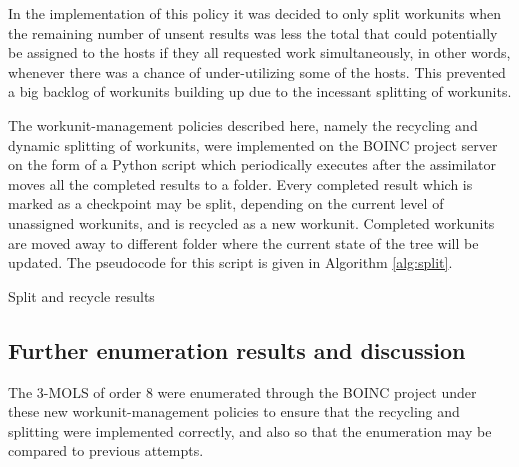 In the implementation of this policy it was decided to only split workunits when the remaining number of unsent results was less the total that could potentially be assigned to the hosts if they all requested work simultaneously, in other words, whenever there was a chance of under-utilizing some of the hosts. This prevented a big backlog of workunits building up due to the incessant splitting of workunits. 

The workunit-management policies described here, namely the recycling and dynamic splitting of workunits, were implemented on the BOINC project server on the form of a Python \cite{python} script which periodically executes after the assimilator moves all the completed results to a folder. Every completed result which is marked as a checkpoint may be split, depending on the current level of unassigned workunits, and is recycled as a new workunit. Completed workunits  are moved away to different folder where the current state of the tree will be updated. The pseudocode for this script is given in Algorithm \ref{alg:split}.
 \begin{algorithm}[htb]
 \BlankLine
{}	
\caption{Split and recycle results} \label{alg:split}%

\end{algorithm}


\subsection{Further enumeration results and discussion}
The 3-MOLS of order 8 were enumerated through the BOINC project under these new workunit-management policies to ensure that the recycling and splitting were implemented correctly, and also so that the enumeration may be compared to previous attempts.

